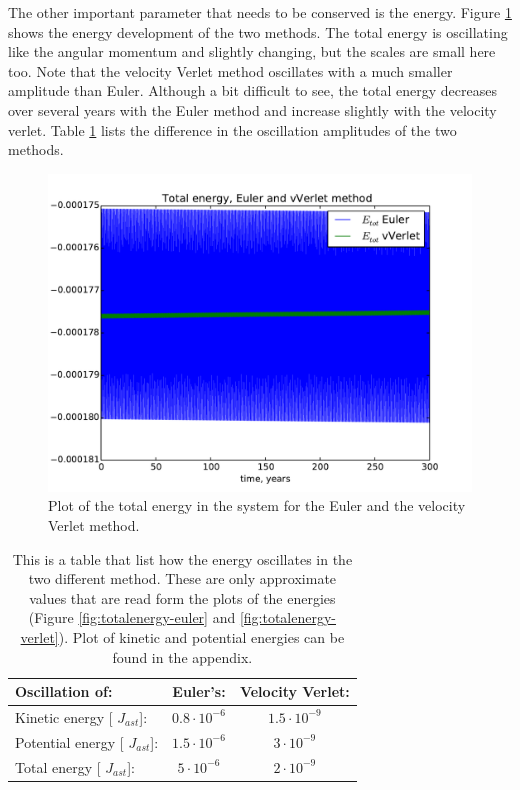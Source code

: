 The other important parameter that needs to be conserved is the energy. Figure \ref{fig:toten_eu_ver} shows the energy development of the two methods. The total energy is oscillating like the angular momentum and slightly changing, but the scales are small here too. Note that the velocity Verlet method oscillates with a much smaller amplitude than Euler. Although a bit difficult to see, the total energy decreases over several years with the Euler method and increase slightly with the velocity verlet. Table \ref{tab:energy_oscillations} lists the difference in the oscillation amplitudes of the two methods. 
\begin{figure}[H]
	\centering
	\includegraphics[width=0.9\linewidth]{../results/plots/toten_compar}
	\caption{Plot of the total energy in the system for the Euler and the velocity Verlet method.}
	\label{fig:toten_eu_ver}
\end{figure}


\begin{table}[H]\caption{This is a table that list how the energy oscillates in the two different method. These are only approximate values that are read form the plots of the energies (Figure \ref{fig:totalenergy-euler} and \ref{fig:totalenergy-verlet}). Plot of kinetic and potential energies can be found in the appendix.} \label{tab:energy_oscillations}
\begin{tabular}{lcc}
\small{Oscillation of:} & \small{Euler's:} & \small{Velocity Verlet:}\\ \hline
\small{Kinetic energy} [ $J_{ast}$]: & $0.8\cdot10^{-6}$ & $1.5 \cdot 10^{-9}$  \\
\small{Potential energy} [ $J_{ast}$]: & $1.5\cdot 10^{-6}$ & $3\cdot10^{-9}$  \\
\small{Total energy} [ $J_{ast}$]:  & $ 5 \cdot 10^{-6}$ & $2\cdot10^{-9}$ \\
\end{tabular}
\end{table}

